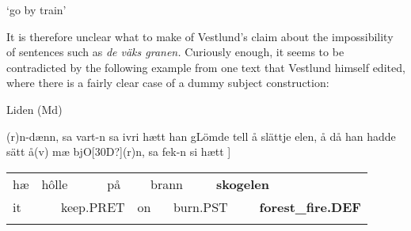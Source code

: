\begin{styleTranslation}
‘go by train’

\end{styleTranslation}

\begin{styleBodyTextFirst}
It is therefore unclear what to make of Vestlund’s claim about the impossibility of sentences such as \textit{de väks granen. }Curiously enough, it seems to be contradicted by the following example from one text that Vestlund himself edited, where there is a fairly clear case of a dummy subject construction:

\end{styleBodyTextFirst}


\begin{listWWNumileveli}
\item 

\begin{styleExample}
Liden (Md)

\end{styleExample}

\end{listWWNumileveli}

\begin{styleBodyTextFirstIndentii}
[Då han fick si bjO[30D?](r)n{}-dænn, sa vart-n sa ivri hætt han gLömde tell å slättje elen, å då han hadde sätt å(v) mæ bjO[30D?](r)n, sa fek-n si hætt ]

\end{styleBodyTextFirstIndentii}

\begin{tabular}{llllllllll}
\lsptoprule
hæ & \multicolumn{2}{l}{hôlle

} & \multicolumn{2}{l}{på

} & \multicolumn{2}{l}{brann

} & \multicolumn{2}{l}{{\bfseries skogelen}

} & \\
\multicolumn{2}{l}{it

} & \multicolumn{2}{l}{keep.PRET

} & \multicolumn{2}{l}{on

} & \multicolumn{2}{l}{burn.PST

} & \multicolumn{2}{l}{{\bfseries forest\_fire.DEF}

}\\
\lspbottomrule
\end{tabular}


